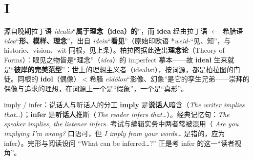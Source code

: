 \documentclass[../main.tex]{subfiles}
\begin{document}
\section{I}




\begin{origin}
源自晚期拉丁语 \textit{idealis}“\textbf{属于理念（idea）的}”，而 \textbf{idea} 经由拉丁语 $\leftarrow$ 希腊语 \textit{idea}“\textbf{形、模样、理念}”，出自 \textit{idein}“\textbf{看见}”（原始印欧语 *\textit{weid-}“见、知”，与 historic、vision、wit 同根，见上条）。柏拉图据此造出\textbf{理念论}（Theory of Forms）：眼见之物皆是“理念”（\textit{idea}）的 imperfect 摹本——故 \textbf{ideal} 生来就是“\textbf{彼岸的完美范型}”：世上的理想主义者（idealist），按词源，都是柏拉图的门徒。同根的 \textbf{idol}（偶像）$<$希腊 \textit{eidōlon}“影像、幻象”是它的孪生兄弟——崇拜的偶像与追求的理想，在词源上一个是“假象”，一个是“真形”。
\end{origin}



\begin{gram}{imply / infer：说话人与听话人的分工}
\textbf{imply} 是\textbf{说话人}暗含（\textit{The writer implies that\dots}）；\textbf{infer} 是\textbf{听话人}推断（\textit{The reader infers that\dots}）。经典记忆句：\textit{The speaker implies, the listener infers.} 考试与编辑实务中两者常被混用（ \textit{Are you implying I'm wrong?} 口语可，但 \textit{I imply from your words\dots} 是错的，应为 infer）。完形与阅读设问 “What can be inferred\dots?” 正是考 infer 的这一“读者视角”。
\end{gram}
\end{document}
